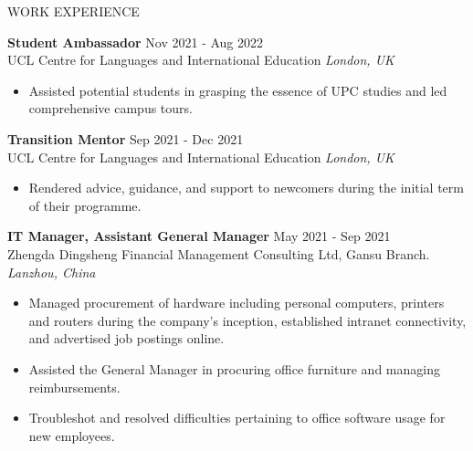 \documentclass{resume} %
\begin{document}
\begin{rSection}{WORK EXPERIENCE}

\textbf{Student Ambassador} \hfill Nov 2021 - Aug 2022\\
UCL Centre for Languages and International Education \hfill \textit{London, UK}
\begin{itemize}
    \itemsep -3pt {} 
    \item Assisted potential students in grasping the essence of UPC studies and led comprehensive campus tours.
\end{itemize}

\textbf{Transition Mentor} \hfill Sep 2021 - Dec 2021\\
UCL Centre for Languages and International Education \hfill \textit{London, UK}
\begin{itemize}
    \itemsep -3pt {} 
    \item Rendered advice, guidance, and support to newcomers during the initial term of their programme.
\end{itemize}
 
\textbf{IT Manager, Assistant General Manager} \hfill May 2021 - Sep 2021\\
Zhengda Dingsheng Financial Management Consulting Ltd, Gansu Branch. \hfill \textit{Lanzhou, China}
\begin{itemize}
    \itemsep -3pt {} 
    \item Managed procurement of hardware including personal computers, printers and routers during the company's inception, established intranet connectivity, and advertised job postings online.
    \item Assisted the General Manager in procuring office furniture and managing reimbursements.
    \item Troubleshot and resolved difficulties pertaining to office software usage for new employees.
\end{itemize}

\end{rSection} 
\end{document}
